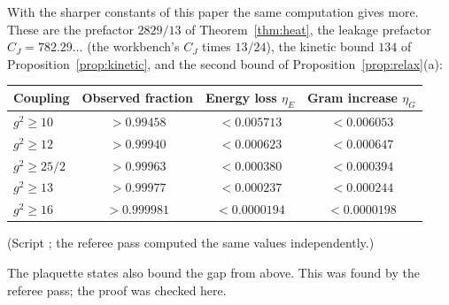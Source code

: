 With the sharper constants of this paper the same computation gives more. These are the prefactor $2829/13$ of Theorem~\ref{thm:heat}, the leakage prefactor $C_J=782.29\ldots$ (the workbench's $C_J$ times $13/24$), the kinetic bound $134$ of Proposition~\ref{prop:kinetic}, and the second bound of Proposition~\ref{prop:relax}(a):

\begin{center}\small
\begin{tabular}{@{}lccc@{}}
\toprule
Coupling & Observed fraction & Energy loss $\eta_E$ & Gram increase $\eta_G$\\
\midrule
$g^2\ge10$ & $>0.99458$ & $<0.005713$ & $<0.006053$\\
$g^2\ge12$ & $>0.99940$ & $<0.000623$ & $<0.000647$\\
$g^2\ge25/2$ & $>0.99963$ & $<0.000380$ & $<0.000394$\\
$g^2\ge13$ & $>0.99977$ & $<0.000237$ & $<0.000244$\\
$g^2\ge16$ & $>0.999981$ & $<0.0000194$ & $<0.0000198$\\
\bottomrule
\end{tabular}
\end{center}
(Script ; the referee pass computed the same values independently.)

The plaquette states also bound the gap from above. This was found by the referee pass; the proof was checked here.

